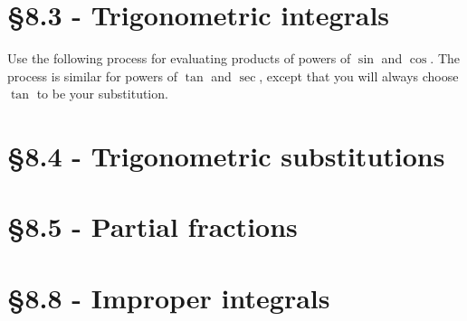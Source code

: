 \documentclass{article}
\begin{document}
\begin{multicols}{2}
\section*{\S 8.3 - Trigonometric integrals}

Use the following process for evaluating products of powers of $\sin$ and $\cos$.
The process is similar for powers of $\tan$ and $\sec$, except that you will always choose
$\tan$ to be your substitution.

\section*{\S 8.4 - Trigonometric substitutions}

\section*{\S 8.5 - Partial fractions}

\section*{\S 8.8 - Improper integrals}
\end{multicols}
\end{document}
